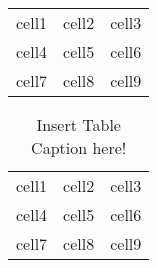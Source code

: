 \begin{center}
    \begin{tabular}{ c c c }
        cell1 & cell2 & cell3 \\ 
        cell4 & cell5 & cell6 \\  
        cell7 & cell8 & cell9    
    \end{tabular}
\end{center}

\begin{table}[h]
\centering
    \begin{tabular}{ |c| c| c| }
     \hline
        cell1 & cell2 & cell3 \\ 
        cell4 & cell5 & cell6 \\  
        cell7 & cell8 & cell9 \\  
     \hline
    \end{tabular}\\
    \caption{Insert Table Caption here!}
    \label{table:1}
\end{table}